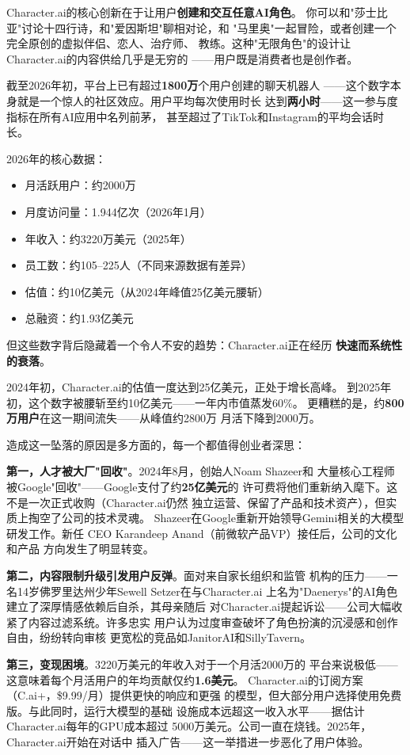 Character.ai的核心创新在于让用户\textbf{创建和交互任意AI角色}。
你可以和"莎士比亚"讨论十四行诗，和"爱因斯坦"聊相对论，和
"马里奥"一起冒险，或者创建一个完全原创的虚拟伴侣、恋人、治疗师、
教练。这种"无限角色"的设计让Character.ai的内容供给几乎是无穷的
——用户既是消费者也是创作者。

截至2026年初，平台上已有超过\textbf{1800万}个用户创建的聊天机器人
——这个数字本身就是一个惊人的社区效应。用户平均每次使用时长
达到\textbf{两小时}——这一参与度指标在所有AI应用中名列前茅，
甚至超过了TikTok和Instagram的平均会话时长。

2026年的核心数据：

\begin{itemize}
  \item 月活跃用户：约2000万
  \item 月度访问量：1.944亿次（2026年1月）
  \item 年收入：约3220万美元（2025年）
  \item 员工数：约105--225人（不同来源数据有差异）
  \item 估值：约10亿美元（从2024年峰值25亿美元腰斩）
  \item 总融资：约1.93亿美元
\end{itemize}

但这些数字背后隐藏着一个令人不安的趋势：Character.ai正在经历
\textbf{快速而系统性的衰落}。

2024年初，Character.ai的估值一度达到25亿美元，正处于增长高峰。
到2025年初，这个数字被腰斩至约10亿美元——一年内市值蒸发60\%。
更糟糕的是，约\textbf{800万用户}在这一期间流失——从峰值约2800万
月活下降到2000万。

造成这一坠落的原因是多方面的，每一个都值得创业者深思：

\textbf{第一，人才被大厂"回收"}。2024年8月，创始人Noam Shazeer和
大量核心工程师被Google"回收"——Google支付了约\textbf{25亿美元}的
许可费将他们重新纳入麾下。这不是一次正式收购（Character.ai仍然
独立运营、保留了产品和技术资产），但实质上掏空了公司的技术灵魂。
Shazeer在Google重新开始领导Gemini相关的大模型研发工作。新任
CEO Karandeep Anand（前微软产品VP）接任后，公司的文化和产品
方向发生了明显转变。

\textbf{第二，内容限制升级引发用户反弹}。面对来自家长组织和监管
机构的压力——一名14岁佛罗里达州少年Sewell Setzer在与Character.ai
上名为"Daenerys"的AI角色建立了深厚情感依赖后自杀，其母亲随后
对Character.ai提起诉讼——公司大幅收紧了内容过滤系统。许多忠实
用户认为过度审查破坏了角色扮演的沉浸感和创作自由，纷纷转向审核
更宽松的竞品如JanitorAI和SillyTavern。

\textbf{第三，变现困境}。3220万美元的年收入对于一个月活2000万的
平台来说极低——这意味着每个月活用户的年均贡献仅约\textbf{1.6美元}。
Character.ai的订阅方案（C.ai+，\$9.99/月）提供更快的响应和更强
的模型，但大部分用户选择使用免费版。与此同时，运行大模型的基础
设施成本远超这一收入水平——据估计Character.ai每年的GPU成本超过
5000万美元。公司一直在烧钱。2025年，Character.ai开始在对话中
插入广告——这一举措进一步恶化了用户体验。

